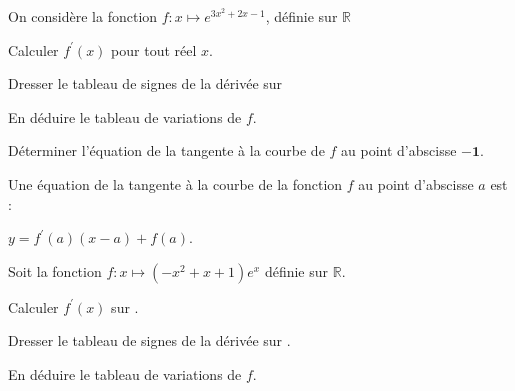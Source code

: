 \documentclass[11pt,a4paper]{article}  %
\begin{document}
On considère la fonction $f: x \mapsto e^{3 x^2+2 x-1}$, définie sur $\mathbb{R}$
\begin{enumMet}
	\item Calculer $f^{\prime}(x)$ pour tout réel $x$.
	\item Dresser le tableau de signes de la dérivée sur \R
	\item En déduire le tableau de variations de $f$.
	\item Déterminer l'équation de la tangente à la courbe de $f$ au point d'abscisse $\mathbf{- 1}$.
	\begin{bprop}
		Une équation de la tangente à la courbe de la fonction $f$ au point d'abscisse $a$ est : 
		
		$y=f^{\prime}(a)(x-a)+f(a)$.
	\end{bprop}
\end{enumMet}
%
%
%
%



Soit la fonction $f: x \mapsto\left(-x^2+x+1\right) e^x$ définie sur $\mathbb{R}$.

\begin{enumMet}
	\item {} Calculer $f^{\prime}(x)$ sur \R.
	\item {} Dresser le tableau de signes de la dérivée sur \R.
	\item {} En déduire le tableau de variations de $f$.
\end{enumMet}
\end{document}
